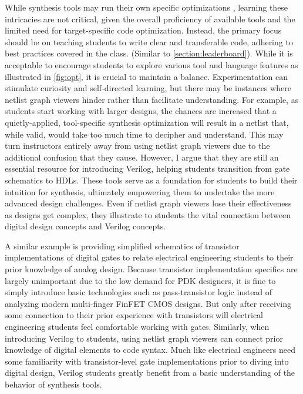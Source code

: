 While synthesis tools may run their own specific optimizations \cite{1364.1-2005}, learning these intricacies are not critical, given the overall proficiency of available tools and the limited need for target-specific code optimization. Instead, the primary focus should be on teaching students to write clear and transferable code, adhering to best practices covered in the class. (Similar to \autoref{section:leaderboard}). While it is acceptable to encourage students to explore various tool and language features as illustrated in \autoref{fig:opt}, it is crucial to maintain a balance. Experimentation can stimulate curiosity and self-directed learning, but there may be instances where netlist graph viewers hinder rather than facilitate understanding. For example, as students start working with larger designs, the chances are increased that a quietly-applied, tool-specific synthesis optimization will result in a netlist that, while valid, would take too much time to decipher and understand. This may turn instructors entirely away from using netlist graph viewers due to the additional confusion that they cause. However, I argue that they are still an essential resource for introducing Verilog, helping students transition from gate schematics to HDLs. These tools serve as a foundation for students to build their intuition for synthesis, ultimately empowering them to undertake the more advanced design challenges. Even if netlist graph viewers lose their effectiveness as designs get complex, they illustrate to students the vital connection between digital design concepts and Verilog concepts.

A similar example is providing simplified schematics of transistor implementations of digital gates to relate electrical engineering students to their prior knowledge of analog design. Because transistor implementation specifics are largely unimportant due to the low demand for PDK designers, it is fine to simply introduce basic technologies such as pass-transistor logic instead of analyzing modern multi-finger FinFET CMOS designs. But only after receiving some connection to their prior experience with transistors will electrical engineering students feel comfortable working with gates. Similarly, when introducing Verilog to students, using netlist graph viewers can connect prior knowledge of digital elements to code syntax. Much like electrical engineers need some familiarity with transistor-level gate implementations prior to diving into digital design, Verilog students greatly benefit from a basic understanding of the behavior of synthesis tools.

